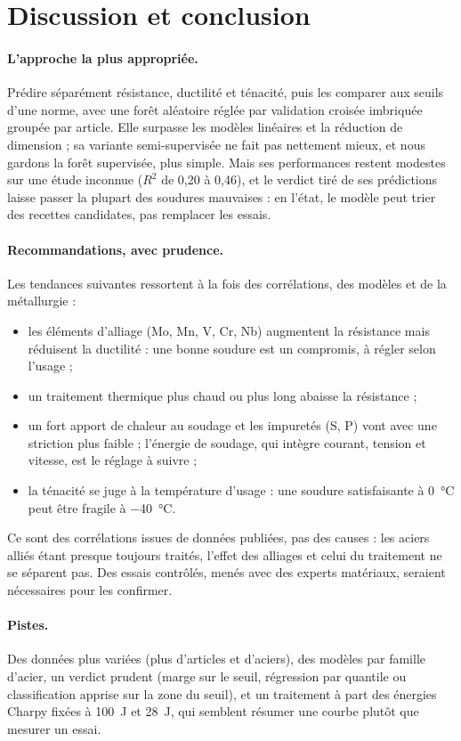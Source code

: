 \section{Discussion et conclusion}

\paragraph{L'approche la plus appropriée.} Prédire séparément résistance, ductilité et
ténacité, puis les comparer aux seuils d'une norme, avec une forêt aléatoire réglée par
validation croisée imbriquée groupée par article. Elle surpasse les modèles linéaires et
la réduction de dimension ; sa variante semi-supervisée ne fait pas nettement mieux, et
nous gardons la forêt supervisée, plus simple. Mais ses performances restent modestes
sur une étude inconnue ($R^2$ de 0,20 à 0,46), et le verdict tiré de ses prédictions
laisse passer la plupart des soudures mauvaises : en l'état, le modèle peut trier des
recettes candidates, pas remplacer les essais.

\paragraph{Recommandations, avec prudence.} Les tendances suivantes ressortent à la fois
des corrélations, des modèles et de la métallurgie :
\begin{itemize}
  \item les éléments d'alliage (Mo, Mn, V, Cr, Nb) augmentent la résistance mais
    réduisent la ductilité : une bonne soudure est un compromis, à régler selon l'usage ;
  \item un traitement thermique plus chaud ou plus long abaisse la résistance ;
  \item un fort apport de chaleur au soudage et les impuretés (S, P) vont avec une
    striction plus faible ; l'énergie de soudage, qui intègre courant, tension et
    vitesse, est le réglage à suivre ;
  \item la ténacité se juge à la température d'usage : une soudure satisfaisante à
    \SI{0}{\celsius} peut être fragile à \SI{-40}{\celsius}.
\end{itemize}
Ce sont des corrélations issues de données publiées, pas des causes : les aciers alliés
étant presque toujours traités, l'effet des alliages et celui du traitement ne se
séparent pas. Des essais contrôlés, menés avec des experts matériaux, seraient
nécessaires pour les confirmer.

\paragraph{Pistes.} Des données plus variées (plus d'articles et d'aciers), des modèles
par famille d'acier, un verdict prudent (marge sur le seuil, régression par quantile ou
classification apprise sur la zone du seuil), et un traitement à part des énergies
Charpy fixées à \SI{100}{\joule} et \SI{28}{\joule}, qui semblent résumer une courbe
plutôt que mesurer un essai.

